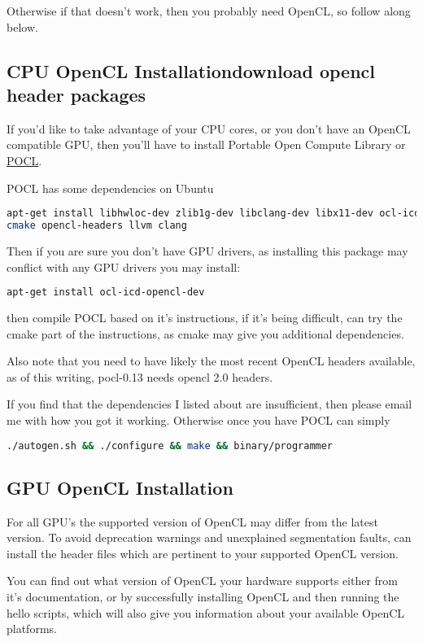 \documentclass[12pt]{report}
\begin{document}
Otherwise if that doesn't work, then you probably need OpenCL,
so follow along below.

\subsection{CPU OpenCL Installationdownload opencl header packages}

If you'd like to take advantage of your CPU cores, or
you don't have an OpenCL compatible GPU, then you'll have to install 
Portable Open Compute Library or
\href{http://pocl.sourceforge.net/}{POCL}.

POCL has some dependencies on Ubuntu
\begin{lstlisting}[language=bash]
apt-get install libhwloc-dev zlib1g-dev libclang-dev libx11-dev ocl-icd-dev
cmake opencl-headers llvm clang
\end{lstlisting}

Then if you are sure you don't have GPU drivers, as installing this package may
conflict with any GPU drivers you may install:
\begin{lstlisting}[language=bash]
apt-get install ocl-icd-opencl-dev
\end{lstlisting}

then compile POCL based on it's instructions, if it's being difficult, can try
the cmake part of the instructions, as cmake may give you additional
dependencies. 

Also note that you need to have likely the most recent OpenCL headers available, 
as of this writing, pocl-0.13 needs opencl 2.0 headers.

If you find that the dependencies I listed about are insufficient, then please
email me with how you got it working.
Otherwise once you have POCL can simply 
\begin{lstlisting}[language=bash]
./autogen.sh && ./configure && make && binary/programmer
\end{lstlisting}

\subsection{GPU  OpenCL Installation}

For all GPU's the supported version of OpenCL may differ from the latest
version. To avoid deprecation warnings and unexplained segmentation faults, 
can install the header files which are pertinent to your supported OpenCL version. 

You can find out what version of OpenCL your hardware supports either from it's
documentation, or by successfully installing OpenCL and then running the hello
scripts, which will also give you information about your available OpenCL
platforms. 
\end{document}

